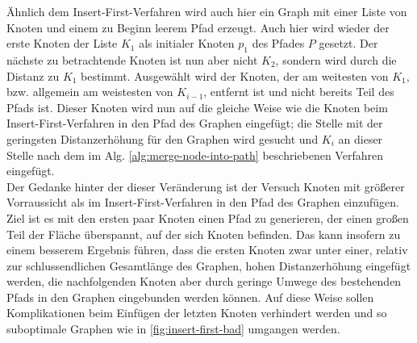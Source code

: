 
Ähnlich dem Insert-First-Verfahren wird auch hier ein Graph mit einer Liste von Knoten und einem zu Beginn leerem Pfad erzeugt.
Auch hier wird wieder der erste Knoten der Liste $K_1$ als initialer Knoten $p_1$ des Pfades $P$ gesetzt.
Der nächste zu betrachtende Knoten ist nun aber nicht $K_2$, sondern wird durch die Distanz zu $K_1$ bestimmt.
Ausgewählt wird der Knoten, der am weitesten von $K_1$, bzw. allgemein am weistesten von $K_{i-1}$, entfernt ist und nicht bereits Teil des Pfads ist.
Dieser Knoten wird nun auf die gleiche Weise wie die Knoten beim Insert-First-Verfahren in den Pfad des Graphen eingefügt; die Stelle mit der geringsten Distanzerhöhung für den Graphen wird gesucht und $K_i$ an dieser Stelle nach dem im \ac{Alg.} \vref{alg:merge-node-into-path} beschriebenen Verfahren eingefügt.\\
Der Gedanke hinter der dieser Veränderung ist der Versuch Knoten mit größerer Vorraussicht als im Insert-First-Verfahren in den Pfad des Graphen einzufügen.
Ziel ist es mit den ersten paar Knoten einen Pfad zu generieren, der einen großen Teil der Fläche überspannt, auf der sich Knoten befinden.
Das kann insofern zu einem besserem Ergebnis führen, dass die ersten Knoten zwar unter einer, relativ zur schlussendlichen Gesamtlänge des Graphen, hohen Distanzerhöhung eingefügt werden, die nachfolgenden Knoten aber durch geringe Umwege des bestehenden Pfads in den Graphen eingebunden werden können.
Auf diese Weise sollen Komplikationen beim Einfügen der letzten Knoten verhindert werden und so suboptimale Graphen wie in \vref{fig:insert-first-bad} umgangen werden.

